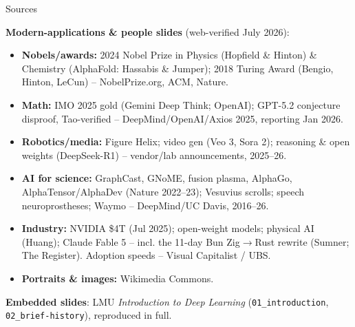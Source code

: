\documentclass[aspectratio=43]{beamer}
\begin{document}
\begin{frame}{Sources}
  {\scriptsize
  \textbf{Modern-applications \& people slides} (web-verified July 2026):
  \begin{itemize}\scriptsize
    \item \textbf{Nobels/awards:} 2024 Nobel Prize in Physics (Hopfield \& Hinton) \& Chemistry
      (AlphaFold: Hassabis \& Jumper); 2018 Turing Award (Bengio, Hinton, LeCun) --
      NobelPrize.org, ACM, Nature.
    \item \textbf{Math:} IMO 2025 gold (Gemini Deep Think; OpenAI); GPT-5.2 conjecture disproof,
      Tao-verified -- DeepMind/OpenAI/Axios 2025, reporting Jan 2026.
    \item \textbf{Robotics/media:} Figure Helix; video gen (Veo 3, Sora 2); reasoning \& open
      weights (DeepSeek-R1) -- vendor/lab announcements, 2025--26.
    \item \textbf{AI for science:} GraphCast, GNoME, fusion plasma, AlphaGo, AlphaTensor/AlphaDev
      (Nature 2022--23); Vesuvius scrolls; speech neuroprostheses; Waymo -- DeepMind/UC Davis, 2016--26.
    \item \textbf{Industry:} NVIDIA \$4T (Jul 2025); open-weight models; physical AI (Huang);
      Claude Fable 5 -- incl. the 11-day Bun Zig$\to$Rust rewrite (Sumner; The Register).
      Adoption speeds -- Visual Capitalist / UBS.
    \item \textbf{Portraits \& images:} Wikimedia Commons.
  \end{itemize}
  \vspace{0.3em}
  \textbf{Embedded slides}: LMU \emph{Introduction to Deep Learning}
  (\texttt{01\_introduction}, \texttt{02\_brief-history}), reproduced in full.}
\end{frame}
\end{document}
